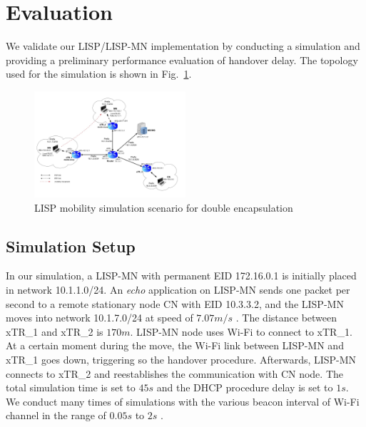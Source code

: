 \section{Evaluation}\label{sec:evaluation}
We validate our LISP/LISP-MN implementation by conducting a simulation  and providing a
preliminary performance evaluation of handover delay.
The topology used for the simulation is shown in Fig.~\ref{sim_scenario}.

\begin{figure}[!th]
	\centering
	\includegraphics[width=0.5\textwidth]{Pics/mobility_through_subnets_2_encap_topo}
	\caption{LISP mobility simulation scenario for double encapsulation}
	\label{sim_scenario}
\end{figure}

\subsection{Simulation Setup}\label{sec:setup}
In our simulation, a LISP-MN with permanent EID 172.16.0.1 is initially placed
in network 10.1.1.0/24. An \emph{echo} application on LISP-MN sends one packet
per second to a remote stationary node CN with EID 10.3.3.2, and the LISP-MN
moves into network 10.1.7.0/24 at speed of $7.07m/s$ .
The distance between xTR\_1 and xTR\_2 is $170m$. LISP-MN node uses Wi-Fi to
connect to xTR\_1. At a certain moment during the move, the Wi-Fi link between
LISP-MN and xTR\_1 goes down, triggering so the handover procedure. Afterwards,
LISP-MN connects to xTR\_2 and reestablishes the communication with CN node. The
total simulation time is set to $45s$ and the DHCP procedure delay is set to
$1s$. We conduct many times of simulations  with the various
beacon interval of Wi-Fi channel in the range of $0.05s$ to $2s$ .


